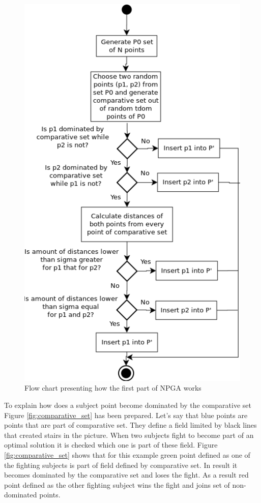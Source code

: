 \documentclass[a4paper, 11pt]{article}
\begin{document}
	\begin{figure}[H]
	\centering
	\includegraphics[scale=0.76]{NP_algorithm}
	\caption{Flow chart presenting how the first part of NPGA works}
	\label{fig:NP_algorithm}
	\end{figure}
	
	To explain how does a subject point become dominated by the comparative set
	Figure \ref{fig:comparative_set} has been prepared.
	Let's say that blue points are points that are part of comparative set.
	They define a field limited by black lines that created stairs in the picture.
	When two subjects fight to become part of an optimal solution it is checked
	which one is part of these field. Figure \ref{fig:comparative_set} shows that
	for this example green point defined as one of the fighting subjects is
	part of field defined by comparative set. In result it becomes dominated by
	the comparative set and loses the fight. As a result red point defined as the
	other fighting subject wins the fight and joins set of non-dominated points.
	
\end{document}
